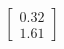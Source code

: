 \documentclass[preview]{standalone}
\begin{document}
\begin{align*}
\begin{bmatrix} 0.32 \\ 1.61 \end{bmatrix}
\end{align*}
\end{document}
